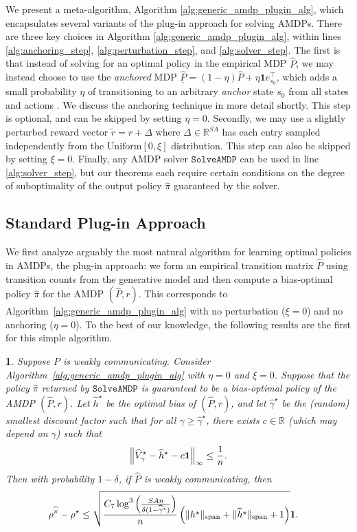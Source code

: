 \documentclass{article}
\theoremstyle{plain}
\newtheorem{thm}{\protect\theoremname}
\theoremstyle{plain}
\theoremstyle{remark}
\theoremstyle{plain}
\theoremstyle{plain}
\providecommand{\theoremname}{Theorem}
\newcommand{\R}{\mathbb{R}}
\newcommand{\Phat}{\widehat{P}}
\newcommand{\Vhat}{\widehat{V}}
\newcommand{\one}{\mathbf{1}}
\newcommand{\pihat}{\widehat{\pi}}
\newcommand{\hhat}{\widehat{h}}
\newcommand{\SolveAMDP}{\texttt{SolveAMDP}}
\newcommand{\Phatanc}{\underline{\Phat}}
\newcommand{\empbod}{\widehat{\gamma}^\star}
\newcommand{\plugin}{plug-in\xspace}
\newcommand{\Plugin}{Plug-in\xspace}
\begin{document}
We present a meta-algorithm, Algorithm \ref{alg:generic_amdp_plugin_alg}, which encapsulates several variants of the \plugin approach for solving AMDPs. There are three key choices in Algorithm \ref{alg:generic_amdp_plugin_alg}, within lines \ref{alg:anchoring_step}, \ref{alg:perturbation_step}, and \ref{alg:solver_step}. The first is that instead of solving for an optimal policy in the empirical MDP $\Phat$, we may instead choose to use the \textit{anchored} MDP $\Phatanc = (1-\eta) \Phat + \eta \one e_{s_0}^\top$, which adds a small probability $\eta$ of transitioning to an arbitrary \textit{anchor} state $s_0$ from all states and actions \citep{fruit_efficient_2018}. We discuss the anchoring technique in more detail shortly. This step is optional, and can be skipped by setting $\eta = 0$. Secondly, we may use a slightly perturbed reward vector $\widetilde{r} = r + \Delta$ where $\Delta \in \R^{SA}$ has each entry sampled independently from the $\text{Uniform}[0 , \xi]$ distribution. This step can also be skipped by setting $\xi = 0$. Finally, any AMDP solver $\SolveAMDP$ can be used in line \ref{alg:solver_step}, but our theorems each require certain conditions on the degree of suboptimality of the output policy $\pihat$ guaranteed by the solver.


\subsection{Standard \Plugin Approach}
We first analyze arguably the most natural algorithm for learning optimal policies in AMDPs, the \plugin approach: we form an empirical transition matrix $\Phat$ using transition counts from the generative model and then compute a bias-optimal policy $\pihat$ for the AMDP $(\Phat, r)$. This corresponds to Algorithm~\ref{alg:generic_amdp_plugin_alg} with no perturbation ($\xi = 0$) and no anchoring ($\eta = 0$).
To the best of our knowledge, the following results are the first for this simple algorithm.

\begin{thm}
    \label{thm:AMDP_plugin_thm}
    Suppose $P$ is weakly communicating. Consider Algorithm~\ref{alg:generic_amdp_plugin_alg} with $\eta=0$ and $\xi=0$.
    Suppose that the policy $\pihat$ returned by $\SolveAMDP$ is guaranteed to be a bias-optimal policy of the AMDP $(\Phat, r)$. Let $\hhat^{\star}$ be the optimal bias of $(\Phat, r)$, and let $\empbod$ be the (random) smallest discount factor such that for all $\gamma \geq \empbod$, there exists $c \in \R$ (which may depend on $\gamma$) such that
    \begin{align}
        \infnorm{\Vhat_\gamma^\star - \hhat^\star - c \one} \leq \frac{1}{n}. \label{eq:bias_optimal_discount_cond}
    \end{align}
    Then with probability $1 - \delta$, if $\Phat$ is weakly communicating, then
    \begin{align*}
        \rho^{\pihat} - \rho^\star & \leq  \sqrt{\frac{C_7 \log^3 \left( \frac{SAn}{\delta(1-\empbod)} \right)}{n} \left(\spannorm{h^\star} + \spannorm{\hhat^\star}+1 \right)}\one.
    \end{align*}
\end{thm}
\end{document}
